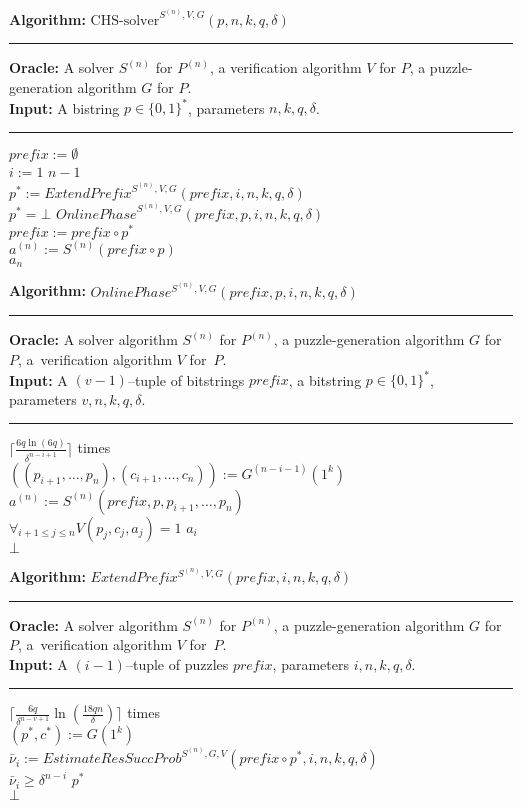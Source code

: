 \vspace*{\fill}
\pagebreak
\begin{codeblock}
  \textbf{Algorithm:} $\text{CHS-solver}^{S^{(n)},V,G}(p, n, k, q, \delta)$
  \medskip\hrule
  \textbf{Oracle:} A solver $S^{(n)}$ for $P^{(n)}$, a verification algorithm $V$ for $P$, a puzzle-generation algorithm $G$ for $P$.\\
  \textbf{Input:}  A bistring $p \in \{0,1\}^{*}$, parameters $n, k, q, \delta$.
  \medskip\hrule
  $\mathit{prefix} := \emptyset$\\
  \For $i := 1$ \To $n\!-\!1$ \Do \\
  \IndI $p^* := \mathit{ExtendPrefix}^{S^{(n)}, V, G}(\mathit{prefix}, i, n, k, q, \delta)$\\
  \IndI \If $p^* = \bot$ \Then \Return $\mathit{OnlinePhase}^{S^{(n)}, V, G}(\mathit{prefix}, p, i, n, k, q, \delta)$ \\
  \IndI \Else $\mathit{prefix} := \mathit{prefix} \circ p^*$\\
  $ a^{(n)} := S^{(n)}(\mathit{prefix} \circ p)$ \\
  \Return $a_n$
\end{codeblock}
%
\begin{codeblock}
  \textbf{Algorithm:} $\mathit{OnlinePhase^{S^{(n)}, V, G}(\mathit{prefix}, p, i, n, k, q, \delta)}$
  \medskip \hrule
  \textbf{Oracle:} A solver algorithm $S^{(n)}$ for $P^{(n)}$, a puzzle-generation algorithm $G$ for $P$, a~verification algorithm $V$ for~$P$.\\
  \textbf{Input:} A $(v-1)$--tuple of bitstrings $\mathit{prefix}$, a bitstring $p \in \{0,1\}^{*}$, \\ parameters $v, n, k, q, \delta$.
  \medskip\hrule
  \Repeat $\Big\lceil\frac{6q \ln (6q)}{\delta^{n-i+1}}\Big\rceil$ times \\
  \IndI $((p_{i+1}, \dotsc, p_{n}),(c_{i+1}, \dots, c_n)) := G^{(n-i-1)}(1^k)$\\
  \IndI $a^{(n)} := S^{(n)}(\mathit{prefix}, p, p_{i+1}, \dotsc, p_n)$\\
  \IndI \If $\forall_{i+1 \leq j \leq n} V(p_j, c_j, a_j) = 1$ \Then \Return $a_i$\\
  \Return $\bot$
\end{codeblock}
%
\begin{codeblock}
  \textbf{Algorithm:} $\mathit{ExtendPrefix^{S^{(n)}, V, G}(prefix, i, n, k, q, \delta)}$
  \medskip \hrule
  \textbf{Oracle:} A solver algorithm $S^{(n)}$ for $P^{(n)}$, a puzzle-generation algorithm $G$ for $P$, a~verification algorithm $V$ for~$P$.\\
  \textbf{Input:} A $(i-1)$--tuple of puzzles $\mathit{prefix}$, parameters $i, n, k, q, \delta$.
  \medskip\hrule
  \Repeat $\Big\lceil \frac{6q}{\delta^{n-v+1}} \ln (\frac{18qn}{\delta}) \Big\rceil$ times \\
  \IndI $(p^*, c^*) := G(1^k) $\\
  \IndI $\bar{\nu}_i := \mathit{EstimateResSuccProb}^{S^{(n)},G,V}(\mathit{prefix} \circ p^*, i, n, k, q, \delta)$\\
  \IndI \If $\bar{\nu}_i \geq \delta^{n-i}$ \Then \Return $p^*$ \\
  \Return $\bot$
\end{codeblock}
